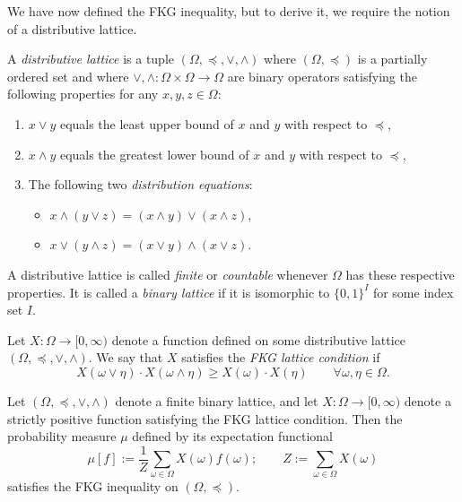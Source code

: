 We have now defined the FKG inequality,
but to derive it, we require the notion of a distributive lattice.

\begin{definition}
    A \emph{distributive lattice} is a tuple $(\Omega,\preceq,\vee,\wedge)$
    where $(\Omega,\preceq)$ is a partially ordered set
    and where $\vee,\wedge:\Omega\times\Omega\to\Omega$
    are binary operators satisfying the following properties
    for any $x,y,z\in\Omega$:
    \begin{enumerate}
        \item $x\vee y$ equals the least upper bound of $x$ and $y$ with respect to $\preceq$,
        \item $x\wedge y$ equals the greatest lower bound of $x$ and $y$ with respect to $\preceq$,
        \item The following two \emph{distribution equations}:
        \begin{itemize}
            \item $x\wedge (y\vee z)=(x\wedge y)\vee(x\wedge z)$,
            \item $x\vee (y\wedge z)=(x\vee y)\wedge(x\vee z)$.
        \end{itemize}
    \end{enumerate}
    A distributive lattice is called \emph{finite} or \emph{countable}
    whenever $\Omega$ has these respective properties.
    It is called a \emph{binary lattice} if it is isomorphic
    to $\{0,1\}^I$ for some index set $I$.
\end{definition}


\begin{definition}
    Let $X:\Omega\to[0,\infty)$ denote a
    function defined on some distributive lattice $(\Omega,\preceq,\vee,\wedge)$.
    We say that $X$ satisfies the \emph{FKG lattice condition}
    if 
    \begin{equation}
        X(\omega\vee\eta)\cdot X(\omega\wedge\eta)
        \geq
        X(\omega)\cdot X(\eta)
        \qquad
        \forall\omega,\eta\in\Omega.
    \end{equation}
\end{definition}

\begin{theorem}[FKG, 1971]
    \label{thm:original_FKG}
    Let $(\Omega,\preceq,\vee,\wedge)$ denote a finite binary lattice,
    and let $X:\Omega\to[0,\infty)$ denote a strictly positive function
    satisfying the FKG lattice condition.
    Then the probability measure $\mu$ defined by its expectation functional
    \[
        \mu[f]:=\frac1Z\sum_{\omega\in\Omega}X(\omega)f(\omega);
        \qquad Z:=\sum_{\omega\in\Omega}X(\omega)
    \]
    satisfies the FKG inequality on $(\Omega,\preceq)$.
\end{theorem}

